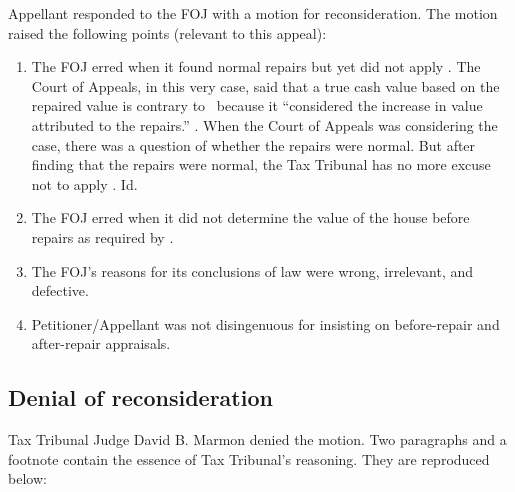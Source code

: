 \documentclass[12pt,\documentclassflag]{michiganCourtOfAppealsBrief}
\begin{document}
Appellant responded to the FOJ with a motion for reconsideration. The motion raised the following points (relevant to this appeal):
\begin{enumerate}
\item The FOJ erred when it found normal repairs but yet did not apply \mathieuGast. The Court of Appeals, in this very case, said that a true cash value based on the repaired value is contrary to \mathieuGast\ because it ``considered the increase in value attributed to the repairs.'' \motionForReconsideration[1]. When the Court of Appeals was considering the case, there was a question of whether the repairs were normal. But after finding that the repairs were normal, the Tax Tribunal has no more excuse not to apply \mathieuGast. Id.
\item The FOJ erred when it did not determine the value of the house before repairs as required by \mathieuGast. 
\item The FOJ's reasons for its conclusions of law were wrong, irrelevant, and defective.
\item Petitioner/Appellant was not disingenuous for insisting on before-repair and after-repair appraisals.
\end{enumerate}

\subsection{Denial of reconsideration}

Tax Tribunal Judge David B. Marmon denied the motion. Two paragraphs and a footnote contain the essence of Tax Tribunal's reasoning. They are reproduced below:
\end{document}
